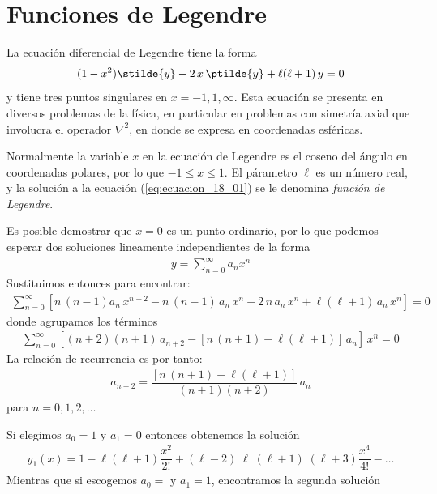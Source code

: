 \section{Funciones de Legendre}
La ecuación diferencial de Legendre tiene la forma
\begin{align}
(1 - x^{2}) \stilde{y} - 2 \, x \, \ptilde{y} + \ell (\ell + 1) \, y = 0
\label{eq:ecuacion_18_01}
\end{align}
y tiene tres puntos singulares en $x = -1, 1, \infty$. Esta ecuación se presenta en diversos problemas de la física, en particular en problemas con simetría axial que involucra el operador $\nabla^{2}$, en donde se expresa en coordenadas esféricas.
\par
Normalmente la variable $x$ en la ecuación de Legendre es el coseno del ángulo en coordenadas polares, por lo que $-1 \leq x \leq 1$. El párametro $\ell$ es un número real, y la solución a la ecuación (\ref{eq:ecuacion_18_01}) se le denomina \emph{función de Legendre}.
\par
Es posible demostrar que $x = 0$ es un punto ordinario, por lo que podemos esperar dos soluciones lineamente independientes de la forma
\begin{align*}
y = \sum_{n=0}^{\infty} a_{n} x^{n}
\end{align*}
Sustituimos entonces para encontrar:
\begin{align*}
\sum_{n=0}^{\infty} \left[ n \, (n - 1) a_{n} \, x^{n-2} - n \, (n - 1) \, a_{n} \, x^{n} - 2 \, n \, a_{n} \, x^{n} + \ell (\ell + 1) \, a_{n} \, x^{n} \right] = 0
\end{align*}
donde agrupamos los términos
\begin{align*}
\sum_{n=0}^{\infty} \left[ (n + 2)(n + 1) \, a_{n+2} - [ n \, (n+1) - \ell (\ell + 1) ] \, a_{n} \right] \, x^{n} = 0
\end{align*}
La relación de recurrencia es por tanto:
\begin{align}
a_{n+2} = \dfrac{[n \, (n + 1)- \ell (\ell + 1)]}{(n + 1)(n + 2)} \, a_{n}
\label{eq:ecuacion_18_02}
\end{align}
para $n = 0, 1, 2, \ldots$
\par
Si elegimos $a_{0} = 1$ y $a_{1} = 0$ entonces obtenemos la solución
\begin{align}
y_{1}(x) = 1 - \ell (\ell + 1) \dfrac{x^{2}}{2!} + (\ell - 2)\; \ell \; (\ell + 1)\;(\ell + 3) \dfrac{x^{4}}{4!} - \ldots
\label{eq:ecuacion_18_03}
\end{align}
Mientras que si escogemos $a_{0} = $ y $ a_{1} = 1 $, encontramos la segunda solución
